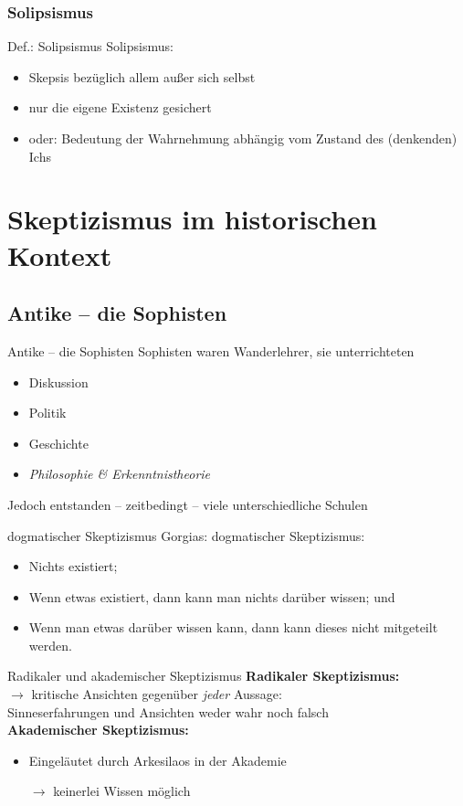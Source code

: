 \documentclass[12pt]{beamer}
\begin{document}
\subsubsection{Solipsismus}
\begin{frame}{Def.: Solipsismus}
Solipsismus:
\begin{itemize}
\item Skepsis bezüglich allem außer sich selbst
\item nur die eigene Existenz gesichert
\item oder: Bedeutung der Wahrnehmung abhängig vom Zustand des (denkenden) Ichs
\end{itemize}
\end{frame}

\section{Skeptizismus im historischen Kontext}
\subsection{Antike – die Sophisten}
\begin{frame}{Antike – die Sophisten}
Sophisten waren Wanderlehrer, sie unterrichteten
\begin{itemize}
\item Diskussion
\item Politik
\item Geschichte
\item \emph{Philosophie \& Erkenntnistheorie}
\end{itemize}
Jedoch entstanden – zeitbedingt – viele unterschiedliche Schulen
\end{frame}

\begin{frame}{dogmatischer Skeptizismus}
Gorgias: dogmatischer Skeptizismus:
\begin{itemize}
\item Nichts existiert;
\item Wenn etwas existiert, dann kann man nichts darüber wissen; und
\item Wenn man etwas darüber wissen kann, dann kann dieses nicht mitgeteilt werden.
\end{itemize}
\end{frame}

\begin{frame}{Radikaler und akademischer Skeptizismus}
\textbf{Radikaler Skeptizismus:}\\
$\rightarrow$ kritische Ansichten gegenüber \emph{jeder} Aussage:\\
\glqq Sinneserfahrungen und Ansichten  weder wahr noch falsch\grqq\\
\textbf{Akademischer Skeptizismus:}\\
\begin{itemize}
\item Eingeläutet durch Arkesilaos in der Akademie
\item[$\rightarrow$] keinerlei Wissen möglich
\end{itemize}
\end{frame}
\end{document}
